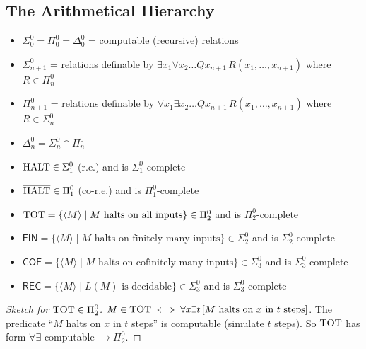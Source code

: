 \subsection{The Arithmetical Hierarchy}
\label{sec:halting:hierarchy}

\begin{definition}
\begin{itemize}
\item $\Sigma^0_0 = \Pi^0_0 = \Delta^0_0$ = computable (recursive) relations
\item $\Sigma^0_{n+1}$ = relations definable by $\exists x_1 \forall x_2 \dots Q x_{n+1} \, R(x_1, \dots, x_{n+1})$ where $R \in \Pi^0_n$
\item $\Pi^0_{n+1}$ = relations definable by $\forall x_1 \exists x_2 \dots Q x_{n+1} \, R(x_1, \dots, x_{n+1})$ where $R \in \Sigma^0_n$
\item $\Delta^0_n = \Sigma^0_n \cap \Pi^0_n$
\end{itemize}
\end{definition}

\begin{theorem}
\begin{itemize}
\item $\text{HALT} \in \Sigma^0_1$ (r.e.) and is $\Sigma^0_1$-complete
\item $\overline{\text{HALT}} \in \Pi^0_1$ (co-r.e.) and is $\Pi^0_1$-complete
\item $\text{TOT} = \{ \langle M \rangle \mid M \text{ halts on all inputs} \} \in \Pi^0_2$ and is $\Pi^0_2$-complete
\item $\mathsf{FIN} = \{ \langle M \rangle \mid M \text{ halts on finitely many inputs} \} \in \Sigma^0_2$ and is $\Sigma^0_2$-complete
\item $\mathsf{COF} = \{ \langle M \rangle \mid M \text{ halts on cofinitely many inputs} \} \in \Sigma^0_3$ and is $\Sigma^0_3$-complete
\item $\mathsf{REC} = \{ \langle M \rangle \mid L(M) \text{ is decidable} \} \in \Sigma^0_3$ and is $\Sigma^0_3$-complete
\end{itemize}
\end{theorem}

\begin{proof}[Sketch for $\text{TOT} \in \Pi^0_2$]
$M \in \text{TOT} \iff \forall x \exists t \, [M \text{ halts on } x \text{ in } t \text{ steps}]$.
The predicate ``$M$ halts on $x$ in $t$ steps'' is computable (simulate $t$ steps).
So $\text{TOT}$ has form $\forall \exists$ computable $\to \Pi^0_2$.
\end{proof}

